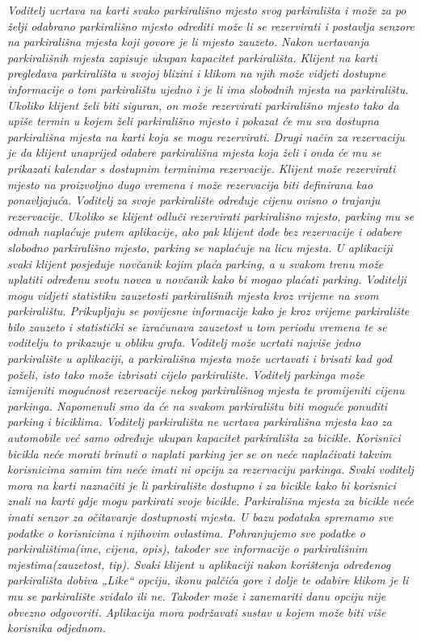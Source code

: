 \textit{Voditelj ucrtava na karti svako parkirališno mjesto svog parkirališta i može za po želji odabrano parkirališno mjesto odrediti može li se rezervirati i postavlja senzore na parkirališna mjesta koji govore je li mjesto zauzeto. Nakon ucrtavanja parkirališnih mjesta zapisuje ukupan kapacitet parkirališta.
Klijent na karti pregledava parkirališta u svojoj blizini i klikom na njih može vidjeti dostupne informacije o tom parkiralištu ujedno i je li ima slobodnih mjesta na parkiralištu. Ukoliko klijent želi biti siguran, on može rezervirati parkirališno mjesto tako da upiše termin u kojem želi parkirališno mjesto i pokazat će mu sva dostupna parkirališna mjesta na karti koja se mogu rezervirati. Drugi način za rezervaciju je da klijent unaprijed odabere parkirališna mjesta koja želi i onda će mu se prikazati kalendar s dostupnim terminima rezervacije. Klijent može rezervirati mjesto na proizvoljno dugo vremena i može rezervacija biti definirana kao ponavljajuća. Voditelj za svoje parkiralište određuje cijenu ovisno o trajanju rezervacije. Ukoliko se klijent odluči rezervirati parkirališno mjesto, parking mu se odmah naplaćuje putem aplikacije, ako pak klijent dođe bez rezervacije i odabere slobodno parkirališno mjesto, parking se naplaćuje na licu mjesta. U aplikaciji svaki klijent posjeduje novčanik kojim plaća parking, a u svakom trenu može uplatiti određenu svotu novca u novčanik kako bi mogao plaćati parking.
Voditelji mogu vidjeti statistiku zauzetosti parkirališnih mjesta kroz vrijeme na svom parkiralištu. Prikupljaju se povijesne informacije kako je kroz vrijeme parkiralište bilo zauzeto i statistički se izračunava zauzetost u tom periodu vremena te se voditelju to prikazuje u obliku grafa. Voditelj može ucrtati najviše jedno parkiralište u aplikaciji, a parkirališna mjesta može ucrtavati i brisati kad god poželi, isto tako može izbrisati cijelo parkiralište. Voditelj parkinga može izmijeniti mogućnost rezervacije nekog parkirališnog mjesta te promijeniti cijenu parkinga. 
Napomenuli smo da će na svakom parkiralištu biti moguće ponuditi parking i biciklima. Voditelj parkirališta ne ucrtava parkirališna mjesta kao za automobile već samo određuje ukupan kapacitet parkirališta za bicikle. Korisnici bicikla neće morati brinuti o naplati parking jer se on neće naplaćivati takvim korisnicima samim tim neće imati ni opciju za rezervaciju parkinga. Svaki voditelj mora na karti naznačiti je li parkiralište dostupno i za bicikle kako bi korisnici znali na karti gdje mogu parkirati svoje bicikle. Parkirališna mjesta za bicikle neće imati senzor za očitavanje dostupnosti mjesta. U bazu podataka spremamo sve podatke o korisnicima i njihovim ovlastima. Pohranjujemo sve podatke o parkiralištima(ime, cijena, opis), također sve informacije o parkirališnim mjestima(zauzetost, tip). Svaki klijent u aplikaciji nakon korištenja određenog parkirališta dobiva „Like“ opciju, ikonu palčića gore  i dolje te odabire klikom je li mu se parkiralište sviđalo ili ne. Također može i zanemariti danu opciju nije obvezno odgovoriti. Aplikacija mora podržavati sustav u kojem može biti više korisnika odjednom.
}

		\eject
		


		
